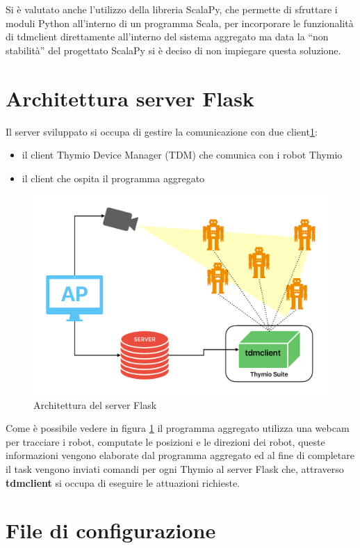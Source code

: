 \documentclass[12pt,a4paper,openright,twoside]{book}
\begin{document}
Si è valutato anche l'utilizzo della libreria ScalaPy, che permette di sfruttare i moduli Python all'interno di un programma Scala, per incorporare le funzionalità di tdmclient direttamente all'interno del sistema aggregato ma data la ``non stabilità'' del progettato ScalaPy si è deciso di non impiegare questa soluzione.

\section{Architettura server Flask}

Il server sviluppato si occupa di gestire la comunicazione con due client\cref{fig:server-arc}:
\begin{itemize}
    \item il client Thymio Device Manager (TDM) che comunica con i robot Thymio
    \item il client che ospita il programma aggregato
\end{itemize}

\begin{figure}
    \centering
    \includegraphics[width=.8\linewidth]{figures/server-arc.pdf}
    \caption{Architettura del server Flask}
    \label{fig:server-arc}
\end{figure}

Come è possibile vedere in figura \cref{fig:server-arc} il programma aggregato utilizza una webcam per tracciare i robot, computate le posizioni e le direzioni dei robot, queste informazioni vengono elaborate dal programma aggregato ed al fine di completare il task vengono inviati comandi per ogni Thymio al server Flask che, attraverso \textbf{tdmclient} si occupa di eseguire le attuazioni richieste. 

\section{File di configurazione}
\end{document}
